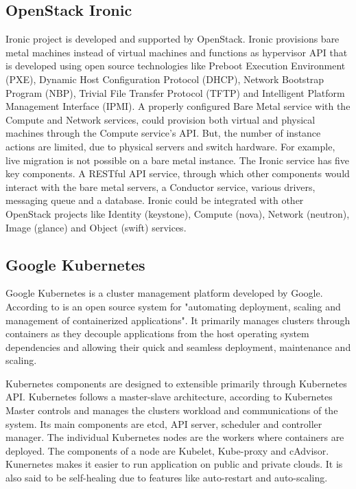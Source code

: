 \subsection{ OpenStack Ironic}

     Ironic \cite{www-ironicwebsite} project is developed and
     supported by OpenStack. Ironic provisions bare metal machines
     instead of virtual machines and functions as hypervisor API that
     is developed using open source technologies like Preboot
     Execution Environment (PXE), Dynamic Host Configuration Protocol
     (DHCP), Network Bootstrap Program (NBP), Trivial File Transfer
     Protocol (TFTP) and Intelligent Platform Management Interface
     (IPMI). A properly configured Bare Metal service with the Compute
     and Network services, could provision both virtual and physical
     machines through the Compute service’s API. But, the number of
     instance actions are limited, due to physical servers and switch
     hardware. For example, live migration is not possible on a bare
     metal instance. The Ironic service has five key components. A
     RESTful API service, through which other components would
     interact with the bare metal servers, a Conductor service,
     various drivers, messaging queue and a database. Ironic could be
     integrated with other OpenStack projects like Identity
     (keystone), Compute (nova), Network (neutron), Image (glance) and
     Object (swift) services.
     
\subsection{ Google Kubernetes}

     Google Kubernetes is a cluster management platform developed by
     Google. According to \cite{www-kubernetesdoc} is an open source
     system for "automating deployment, scaling and management of
     containerized applications". It primarily manages clusters
     through containers as they decouple applications from the
     host operating system dependencies and allowing their quick and
     seamless deployment, maintenance and scaling.

     Kubernetes components are designed to extensible primarily
     through Kubernetes API. Kubernetes follows a master-slave
     architecture, according to \cite{www-kuberneteswiki} Kubernetes
     Master controls and manages the clusters workload and
     communications of the system. Its main components are etcd, API
     server, scheduler and controller manager. The individual
     Kubernetes nodes are the workers where containers are
     deployed. The components of a node are Kubelet, Kube-proxy and
     cAdvisor. Kunernetes makes it easier to run application on public
     and private clouds. It is also said to be self-healing due to
     features like auto-restart and auto-scaling.
     
